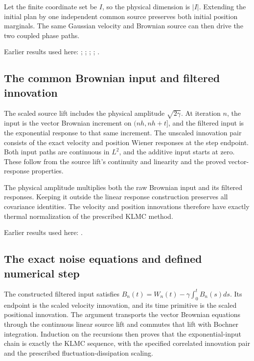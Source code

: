 \documentclass[11pt,a4paper]{report}
\begin{document}
Let the finite coordinate set be \(I\), so the physical dimension is \(|I|\). Extending the initial plan by one independent common source preserves both initial position marginals. The same Gaussian velocity and Brownian source can then drive the two coupled phase paths.



Earlier results used here: \cite[Section~3.17.1]{LangevinLean2026ULASC}; \cite[Section~3.22.2]{LangevinLean2026ULASC}; \cite[Section~3.22.3]{LangevinLean2026ULASC}; \cite[Section~3.8.16]{LangevinLean2026ULASC}; \cite[Section~3.8.17]{LangevinLean2026ULASC}.
\subsection{\texorpdfstring{The common Brownian input and filtered innovation}{The common Brownian input and filtered innovation}}
\label{report-step-KineticLangevin-GenericCanonicalKLMC-lean-2}


The scaled source lift includes the physical amplitude \(\sqrt{2\gamma}\). At iteration \(n\), the input is the vector Brownian increment on \((nh,nh+t]\), and the filtered input is the exponential response to that same increment. The unscaled innovation pair consists of the exact velocity and position Wiener responses at the step endpoint. Both input paths are continuous in \(L^{2}\), and the additive input starts at zero. These follow from the source lift's continuity and linearity and the proved vector-response properties.



The physical amplitude multiplies both the raw Brownian input and its filtered responses. Keeping it outside the linear response construction preserves all covariance identities. The velocity and position innovations therefore have exactly thermal normalization of the prescribed KLMC method.



Earlier results used here: \cite[Section~3.17.1]{LangevinLean2026ULASC}.
\subsection{\texorpdfstring{The exact noise equations and defined numerical step}{The exact noise equations and defined numerical step}}
\label{report-step-KineticLangevin-GenericCanonicalKLMC-lean-3}


The constructed filtered input satisfies \(B_n(t)=W_n(t)-\gamma\int_0^tB_n(s)ds\). Its endpoint is the scaled velocity innovation, and its time primitive is the scaled positional innovation. The argument transports the vector Brownian equations through the continuous linear source lift and commutes that lift with Bochner integration. Induction on the recursions then proves that the exponential-input chain is exactly the KLMC sequence, with the specified correlated innovation pair and the prescribed fluctuation-dissipation scaling.
\end{document}
